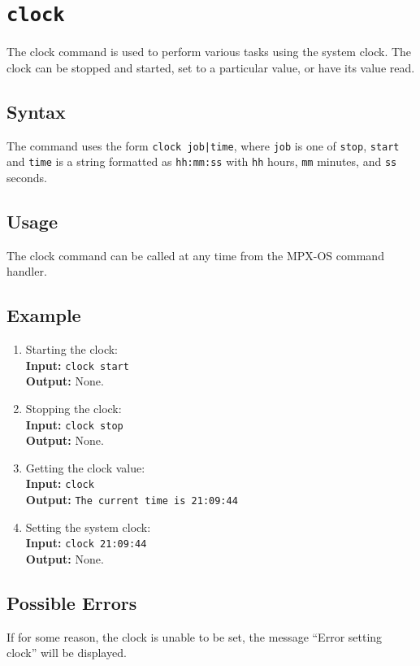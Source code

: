 \section{\tt clock}
\label{clock_cmd}

The clock command is used to perform various tasks using the system clock. The clock can
be stopped and started, set to a particular value, or have its value read.

\subsection{Syntax}

The command uses the form {\tt clock job|time}, where {\tt job} is one of {\tt stop}, 
{\tt start} and {\tt time} is a string formatted as {\tt hh:mm:ss} with {\tt hh} hours, 
{\tt mm} minutes, and {\tt ss} seconds.

\subsection{Usage}

The clock command can be called at any time from the MPX-OS command handler.

\subsection{Example}
\begin{enumerate}
    \item Starting the clock: \\
        {\bf Input:} {\tt clock start} \\
        {\bf Output:} None.
    \item Stopping the clock: \\
        {\bf Input:} {\tt clock stop} \\
        {\bf Output:} None.
    \item Getting the clock value: \\
        {\bf Input:} {\tt clock} \\
        {\bf Output:} {\tt The current time is 21:09:44}
    \item Setting the system clock: \\
        {\bf Input:} {\tt clock 21:09:44} \\
        {\bf Output:} None.
\end{enumerate}
\subsection{Possible Errors}

If for some reason, the clock is unable to be set, the message ``Error setting clock'' 
will be displayed.








